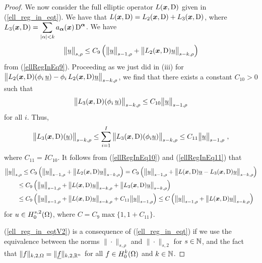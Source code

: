 \begin{proof}
 We now consider the full elliptic operator
$L({\bm{x}},\operatorname{D})$ given in (\ref{ell_reg_in_eqt}).  We have that
$L({\bm{x}},\operatorname{D}) = L_2({\bm{x}},\operatorname{D}) + L_3({\bm{x}},\operatorname{D})$, where
$\displaystyle L_3({\bm{x}},\operatorname{D})
= \sum_{|\alpha|< k} a_{{\bm{\alpha}}}({\bm{x}}) \operatorname{D}^{{\bm{\alpha}}}$.
We have
\begin{equation} \label{ellRegInEq10}
\big\|\underline{u}\big\|_{s,\rho} \leq C_9
\left( \big\|\underline{u}\big\|_{s-1,\rho} +
\big\|L_2({\bm{x}},\operatorname{D})\underline{u}\big\|_{s-k,\rho} \right)
\end{equation}
from (\ref{ellRegInEq9}).  Proceeding as we just did in (iii) for
$\displaystyle \big\|L_2({\bm{x}},\operatorname{D})(\phi_i\,\underline{u})
- \phi_i\, L_2({\bm{x}},\operatorname{D})\underline{u} \big\|_{s-k,\rho}$, we find
that there exists a constant $C_{10}>0$ such that
\[
 \big\| L_3({\bm{x}},\operatorname{D})(\phi_i\,\underline{u}) \big\|_{s-k,\rho}
\leq C_{10} \big\|\underline{u}\big\|_{s-1,\rho}
\]
for all $i$.  Thus,
\begin{equation} \label{ellRegInEq11}
\big\| L_3(\VEC{x},\diff)(\underline{u}) \big\|_{s-k,\rho}
\leq \sum_{i=1}^I \big\| L_3(\VEC{x},\diff)(\phi_i \underline{u})
\big\|_{s-k,\rho} \leq C_{11} \big\|\underline{u}\big\|_{s-1,\rho} \ ,
\end{equation}
where $C_{11} = I C_{10}$.  It follows from (\ref{ellRegInEq10}) and
(\ref{ellRegInEq11}) that
\begin{align*}
&\big\|\underline{u}\big\|_{s,\rho}
\leq C_9 \left( \big\|\underline{u}\big\|_{s-1,\rho} +
\big\|L_2({\bm{x}},\operatorname{D})\underline{u}\big\|_{s-k,\rho} \right)
= C_9 \left( \big\|\underline{u}\big\|_{s-1,\rho} +
\big\|L({\bm{x}},\operatorname{D})\underline{u}
- L_3({\bm{x}},\operatorname{D})\underline{u}\big\|_{s-k,\rho} \right) \\
&\qquad \leq C_9 \left( \big\|\underline{u}\big\|_{s-1,\rho} +
\big\|L({\bm{x}},\operatorname{D})\underline{u}\big\|_{s-k,\rho} +
\big\|L_3({\bm{x}},\operatorname{D})\underline{u}\big\|_{s-k,\rho} \right) \\
&\qquad \leq C_9 \left( \big\|\underline{u}\big\|_{s-1,\rho} +
\big\|L({\bm{x}},\operatorname{D})\underline{u}\big\|_{s-k,\rho} +
C_{11} \big\|\underline{u}\big\|_{s-1,\rho} \right)
\leq C \left( \big\|\underline{u}\big\|_{s-1,\rho} +
\big\|L({\bm{x}},\operatorname{D})\underline{u}\big\|_{s-k,\rho} \right)
\end{align*}
for $\displaystyle u \in H^{s,2}_0(\Omega)$, where $C = C_9 \max\{1, 1+C_{11}\}$.

 (\ref{ell_reg_in_eqtV2}) is a consequence of
(\ref{ell_reg_in_eqt}) if we use the equivalence between the norms
$\|\cdot\|_{s,\rho}$ and $\|\cdot\|_{s,2}$ for $s\in \mathbb{N}$, and the
fact that $\|f\|_{k,2,\Omega} = \|\underline{f}\|_{k,2,\mathbb{R}^n}$ for all
$\displaystyle f \in H^k_0(\Omega)$ and $k \in \mathbb{N}$.
\end{proof}

